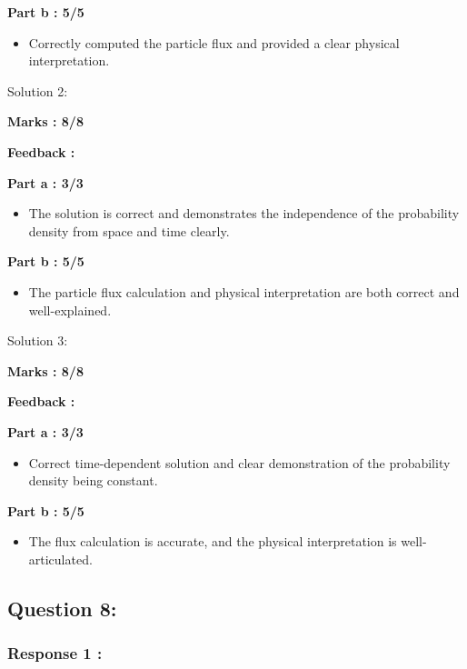\documentclass[a4paper,11pt]{article}
\begin{document}
\textbf{Part b : 5/5}

\begin{itemize}
    \item Correctly computed the particle flux and provided a clear physical interpretation.
\end{itemize}



Solution 2:

\textbf{Marks : 8/8}

\textbf{Feedback : }

\textbf{Part a : 3/3}

\begin{itemize}
    \item The solution is correct and demonstrates the independence of the probability density from space and time clearly.
\end{itemize}


\textbf{Part b : 5/5}

\begin{itemize}
    \item The particle flux calculation and physical interpretation are both correct and well-explained.
\end{itemize}


Solution 3:

\textbf{Marks : 8/8}

\textbf{Feedback : }

\textbf{Part a : 3/3}

\begin{itemize}
    \item Correct time-dependent solution and clear demonstration of the probability density being constant.
\end{itemize}


\textbf{Part b : 5/5}

\begin{itemize}
    \item The flux calculation is accurate, and the physical interpretation is well-articulated.
\end{itemize}




\subsection*{Question 8:}

\subsubsection*{Response 1 :}
\end{document}
